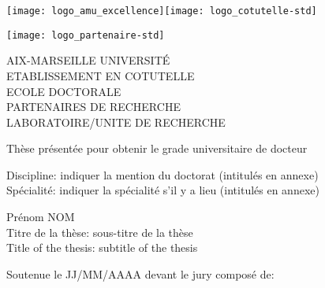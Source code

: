 \titlepage{}\selectfont{}
\vspace*{-2cm}
\begin{center}
	\begin{minipage}[c]{0.70\linewidth}
		\raggedright\texttt{[image: logo\_amu\_excellence]}\quad\texttt{[image: logo\_cotutelle-std]}
	\end{minipage}\hfill
	\begin{minipage}[c]{0.30\linewidth}
		\raggedleft\texttt{[image: logo\_partenaire-std]}
	\end{minipage}\hfill
\end{center}
\begin{flushleft}
	\vspace{0.2cm}
	\LARGE AIX-MARSEILLE UNIVERSITÉ\\
	\LARGE\textcolor{black!50}{ETABLISSEMENT EN COTUTELLE}\\
	\Large ECOLE DOCTORALE\\
	\vspace{0.2cm}
	\normalsize\textcolor{black!50}{PARTENAIRES DE RECHERCHE}\\
	\vspace{0.2cm}
	LABORATOIRE/UNITE DE RECHERCHE\\
    \begin{center}
		\vspace{1.8cm}
		Thèse présentée pour obtenir le grade universitaire de docteur\\
    \end{center}
	\vspace{0.5cm}
    Discipline: indiquer la mention du doctorat (intitulés en annexe)\\
    Spécialité: indiquer la spécialité s'il y a lieu (intitulés en annexe)\\
    \begin{center}
        \vspace{0.5cm}
        \Large Prénom NOM\\
        \vspace{1cm}
				\large Titre de la thèse: sous-titre de la thèse\\
				\vspace{0.5cm}
				\normalsize Title of the thesis: subtitle of the thesis\\
    \end{center}
	\vspace{3.4cm}
    \normalsize Soutenue le JJ/MM/AAAA devant le jury composé de:\\
\end{flushleft}
